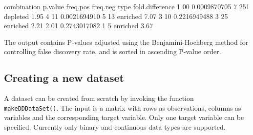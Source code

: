 \documentclass{article}
\newcommand{\Rfun}[1]{{\texttt{#1}}}
\begin{document}
\begin{Schunk}
\begin{Soutput}
  combination      p.value freq.pos freq.neg     type fold.difference
1          00 0.0009870705        7      251 depleted            1.95
4          11 0.0021694910        5       13 enriched            7.07
3          10 0.2216949488        3       25 enriched            2.21
2          01 0.2743017082        1        5 enriched            3.67
\end{Soutput}
\end{Schunk}

The output contains P-values adjusted using the Benjamini-Hochberg method for controlling false discovery rate, and is sorted in ascending P-value order. 

\subsection{Creating a new dataset}\label{sec:create}

A dataset can be created from scratch by invoking the function \Rfun{makeDDDataSet()}. The input is a matrix with rows as observations, columns as variables and the corresponding target variable. Only one target variable can be specified. Currently only binary and continuous data types are supported. 
\end{document}
